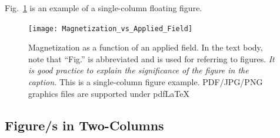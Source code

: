 Fig.~\ref{fig:mag_v_field} is an example of a single-column floating figure.


\begin{figure}[!tb]
	\centering
	\texttt{[image: Magnetization\_vs\_Applied\_Field]}
	\caption{Magnetization as a function of an applied field. In the text body, note that ``Fig.'' is abbreviated and is used for referring to figures. \emph{It is good practice to explain the significance of the figure in the caption.} This is a single-column figure example. PDF/JPG/PNG graphics files are supported under pdf\LaTeX}
	\label{fig:mag_v_field}
\end{figure}





\subsection{Figure/s in Two-Columns}

